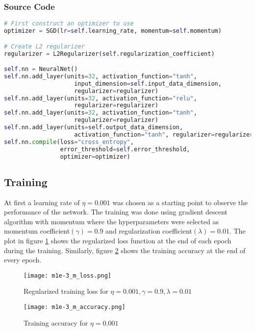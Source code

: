 \documentclass{article}
\begin{document}
\subsubsection{Source Code}
\begin{lstlisting}[language=python]
# First construct an optimizer to use
optimizer = SGD(lr=self.learning_rate, momentum=self.momentum)

# Create L2 regularizer
regularizer = L2Regularizer(self.regularization_coefficient)

self.nn = NeuralNet()
self.nn.add_layer(units=32, activation_function="tanh",
                    input_dimension=self.input_data_dimension,
                    regularizer=regularizer)
self.nn.add_layer(units=32, activation_function="relu",
                    regularizer=regularizer)
self.nn.add_layer(units=32, activation_function="tanh",
                    regularizer=regularizer)
self.nn.add_layer(units=self.output_data_dimension,
                    activation_function="tanh", regularizer=regularizer)
self.nn.compile(loss="cross_entropy",
                error_threshold=self.error_threshold,
                optimizer=optimizer)
\end{lstlisting}

\subsection{Training}
At first a learning rate of $\eta = 0.001$ was chosen as a starting point
to observe the performance of the network. The training was done using gradient
descent algorithm with momentum where the hyperparameters were selected as
momentum coefficient$(\gamma) = 0.9$ and regularization coefficient$(\lambda)=0.01$.  The plot in figure \ref{fig:mnist_three_loss} shows
the regularized loss function at the end of each epoch during the training. Similarly, figure \ref{fig:mnist_three_accuracy} shows the
training accuracy at the end of every epoch.

\begin{figure}[!ht]
  \texttt{[image: m1e-3\_m\_loss.png]}
  \caption{Regularized training loss for $\eta = 0.001, \gamma = 0.9, \lambda=0.01$}
  \label{fig:mnist_three_loss}
\end{figure}

\begin{figure}[!ht]
  \texttt{[image: m1e-3\_m\_accuracy.png]}
  \caption{Training accuracy for $\eta = 0.001$}
  \label{fig:mnist_three_accuracy}
\end{figure}
\end{document}
